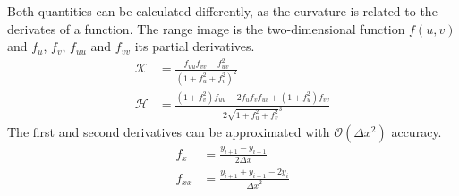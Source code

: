 Both quantities can be calculated differently, as the curvature is related to the derivates of a function.
The range image is the two-dimensional function $f(u, v)$ and $f_u$, $f_v$, $f_{uu}$ and $f_{vv}$ its partial derivatives.
\begin{equation}
\begin{aligned}
    \mathcal{K} &= \frac{f_{uu} f_{vv} - f_{uv}^2}{{(1 + f_u^2 + f_v^2)}^2} \\
    \mathcal{H} &= \frac{{(1 + f_{v}^2)} f_{uu} - 2 f_u f_v f_{uv} + {(1 + f_u^2)} f_{vv}}{2 \sqrt{1 + f_u^2 + f_v^2}^3}
\end{aligned}
\end{equation}
The first and second derivatives can be approximated with $\mathcal{O}(\Delta x^2)$ accuracy.
\begin{align*}
    f_{x} &= \frac{y_{i+1} - y_{i-1}}{2 \Delta x} \\
    f_{xx} &= \frac{y_{i+1} + y_{i-1} - 2 y_{i}}{{\Delta x}^2}
\end{align*}

